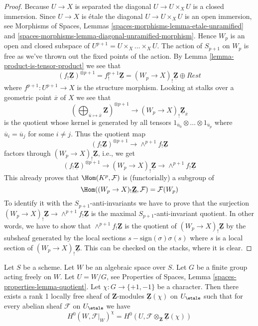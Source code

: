 \begin{proof}
Because $U \to X$ is separated the diagonal $U \to U \times_X U$ is a
closed immersion. Since $U \to X$ is \'etale the diagonal
$U \to U \times_X U$ is an open immersion, see
Morphisms of Spaces, Lemmas
\ref{spaces-morphisms-lemma-etale-unramified} and
\ref{spaces-morphisms-lemma-diagonal-unramified-morphism}.
Hence $W_p$ is an open and closed subspace of
$U^{p + 1} = U \times_X \ldots \times_X U$. The action of $S_{p + 1}$
on $W_p$ is free as we've thrown out the fixed points of the action.
By
Lemma \ref{lemma-product-is-tensor-product}
we see that
$$
(f_!\underline{\mathbf{Z}})^{\otimes p + 1} =
f^{p + 1}_!\underline{\mathbf{Z}} = (W_p \to X)_!\underline{\mathbf{Z}}
\oplus Rest
$$
where $f^{p + 1} : U^{p + 1} \to X$ is the structure morphism.
Looking at stalks over a geometric point $\overline{x}$ of $X$
we see that
$$
\left(
\bigoplus\nolimits_{\overline{u} \mapsto \overline{x}} \mathbf{Z}
\right)^{\otimes p + 1}
\longrightarrow
(W_p \to X)_!\underline{\mathbf{Z}}_{\overline{x}}
$$
is the quotient whose kernel is generated by all tensors
$1_{\overline{u}_0} \otimes \ldots \otimes 1_{\overline{u}_p}$
where $\overline{u}_i = \overline{u}_j$ for some $i \not = j$.
Thus the quotient map
$$
(f_!\underline{\mathbf{Z}})^{\otimes p + 1}
\longrightarrow
\wedge^{p + 1}f_!\underline{\mathbf{Z}}
$$
factors through $(W_p \to X)_!\underline{\mathbf{Z}}$, i.e., we get
$$
(f_!\underline{\mathbf{Z}})^{\otimes p + 1}
\longrightarrow
(W_p \to X)_!\underline{\mathbf{Z}}
\longrightarrow
\wedge^{p + 1}f_!\underline{\mathbf{Z}}
$$
This already proves that $\Hom(K^p, \mathcal{F})$ is (functorially) a
subgroup of
$$
\Hom((W_p \to X)_!\underline{\mathbf{Z}}, \mathcal{F}) = \mathcal{F}(W_p)
$$
To identify it with the $S_{p + 1}$-anti-invariants we have to prove that
the surjection $(W_p \to X)_!\underline{\mathbf{Z}}
\to \wedge^{p + 1}f_!\underline{\mathbf{Z}}$ is the maximal
$S_{p + 1}$-anti-invariant quotient. In other words, we have to show that
$\wedge^{p + 1}f_!\underline{\mathbf{Z}}$ is the quotient of
$(W_p \to X)_!\underline{\mathbf{Z}}$ by the subsheaf generated by
the local sections $s - \text{sign}(\sigma)\sigma(s)$ where $s$ is
a local section of $(W_p \to X)_!\underline{\mathbf{Z}}$.
This can be checked on the stacks, where it is clear.
\end{proof}

\begin{lemma}
\label{lemma-twist}
Let $S$ be a scheme. Let $W$ be an algebraic space over $S$.
Let $G$ be a finite group acting freely on $W$.
Let $U = W/G$, see
Properties of Spaces, Lemma \ref{spaces-properties-lemma-quotient}.
Let $\chi : G \to \{+1, -1\}$ be a character.
Then there exists a rank 1 locally free sheaf of $\mathbf{Z}$-modules
$\underline{\mathbf{Z}}(\chi)$ on $U_\etale$ such that for every
abelian sheaf $\mathcal{F}$ on $U_\etale$ we have
$$
H^0(W, \mathcal{F}|_W)^\chi =
H^0(U, \mathcal{F} \otimes_{\mathbf{Z}} \underline{\mathbf{Z}}(\chi))
$$
\end{lemma}

